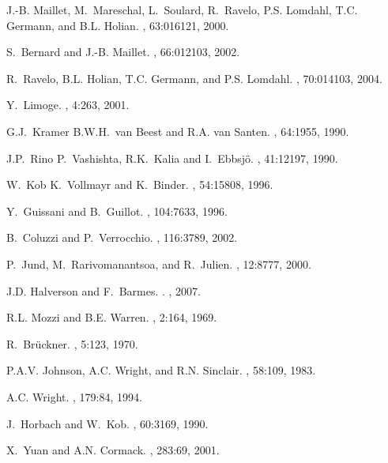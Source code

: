 \documentclass[aps,10pt,twocolumn]{revtex4}
\begin{document}
\begin{thebibliography}{10}
J.-B. Maillet, M.~Mareschal, L.~Soulard, R.~Ravelo, P.S. Lomdahl, T.C. Germann,
  and B.L. Holian.
, 63:016121, 2000.

S.~Bernard and J.-B. Maillet.
, 66:012103, 2002.

R.~Ravelo, B.L. Holian, T.C. Germann, and P.S. Lomdahl.
, 70:014103, 2004.

Y.~Limoge.
, 4:263, 2001.

G.J.~Kramer B.W.H.~van Beest and R.A. van Santen.
, 64:1955, 1990.

J.P.~Rino P.~Vashishta, R.K.~Kalia and I.~Ebbsj\"o.
, 41:12197, 1990.

W.~Kob K.~Vollmayr and K.~Binder.
, 54:15808, 1996.

Y.~Guissani and B.~Guillot.
, 104:7633, 1996.

B.~Coluzzi and P.~Verrocchio.
, 116:3789, 2002.

P.~Jund, M.~Rarivomanantsoa, and R.~Julien.
, 12:8777, 2000.

J.D. Halverson and F.~Barmes.
\newblock {}.
, 2007.

R.L. Mozzi and B.E. Warren.
, 2:164, 1969.

R.~Br\"uckner.
, 5:123, 1970.

P.A.V. Johnson, A.C. Wright, and R.N. Sinclair.
, 58:109, 1983.

A.C. Wright.
, 179:84, 1994.

J.~Horbach and W.~Kob.
, 60:3169, 1990.

X.~Yuan and A.N. Cormack.
, 283:69, 2001.


\end{thebibliography}
\end{document}
